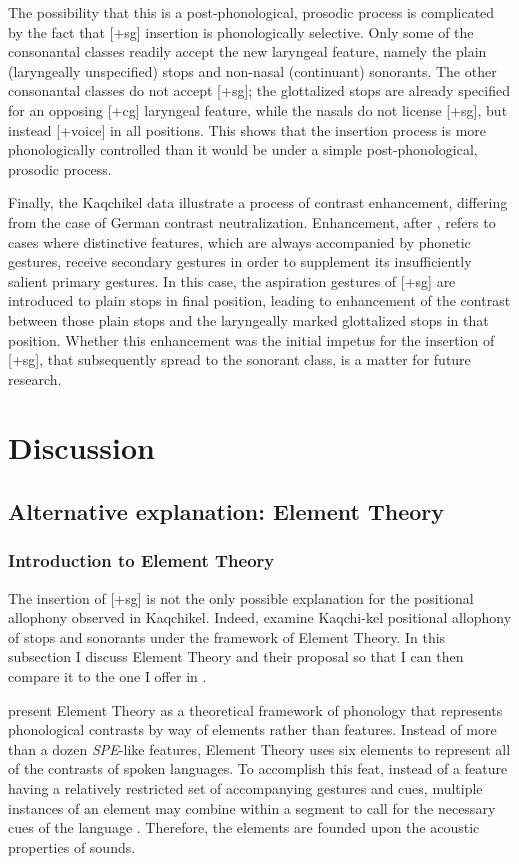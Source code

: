 \documentclass[output=paper,colorlinks,citecolor=brown]{langscibook}
\begin{document}
The possibility that this is a post-phonological, prosodic process is complicated by the fact that [+sg] insertion is phonologically selective. Only some of the consonantal classes readily accept the new laryngeal feature, namely the plain (laryngeally unspecified) stops and non-nasal (continuant) sonorants. The other consonantal classes do not accept [+sg]; the glottalized stops are already specified for an opposing [+cg] laryngeal feature, while the nasals do not license [+sg], but instead [+voice] in all positions. This shows that the insertion process is more phonologically controlled than it would be under a simple post-phonological, prosodic process.

Finally, the Kaqchikel data illustrate a process of contrast enhancement, differing from the case of German contrast neutralization. Enhancement, after \citet{keyser_stevens_2006}, refers to cases where distinctive features, which are always accompanied by phonetic gestures, receive secondary gestures in order to supplement its insufficiently salient primary gestures. In this case, the aspiration gestures of [+sg] are introduced to plain stops in final position, leading to enhancement of the contrast between those plain stops and the laryngeally marked glottalized stops in that position. Whether this enhancement was the initial impetus for the insertion of [+sg], that subsequently spread to the sonorant class, is a matter for future research.

\section{Discussion}\label{Discussion}
\subsection{Alternative explanation: Element Theory}\label{Alternative explanation: Element Theory}
\subsubsection{Introduction to Element Theory}
The insertion of [+sg] is not the only possible explanation for the positional allophony observed in Kaqchikel. Indeed, \citet{nasukawa_backley_2018} examine Kaqchi-kel positional allophony of stops and sonorants under the framework of Element Theory. In this subsection I discuss Element Theory and their proposal so that I can then compare it to the one I offer in .

\citet{harris_lindsay_1995} present Element Theory as a theoretical framework of phonology that represents phonological contrasts by way of elements rather than features. Instead of more than a dozen \emph{SPE}-like features, Element Theory uses six elements to represent all of the contrasts of spoken languages. To accomplish this feat, instead of a feature having a relatively restricted set of accompanying gestures and cues, multiple instances of an element may combine within a segment to call for the necessary cues of the language \citep{nasukawa_backley_2018}. Therefore, the elements are founded upon the acoustic properties of sounds.
\end{document}
